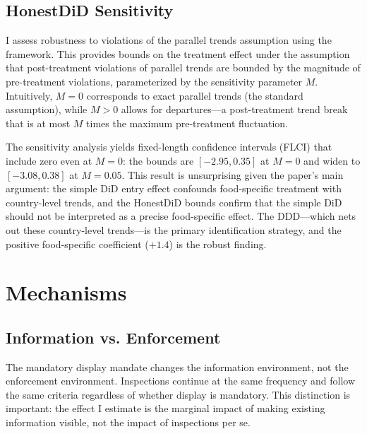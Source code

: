 \documentclass[12pt]{article}
\begin{document}
\subsection{HonestDiD Sensitivity}

I assess robustness to violations of the parallel trends assumption using the \citet{rambachan2023more} framework. This provides bounds on the treatment effect under the assumption that post-treatment violations of parallel trends are bounded by the magnitude of pre-treatment violations, parameterized by the sensitivity parameter $M$. Intuitively, $M=0$ corresponds to exact parallel trends (the standard assumption), while $M>0$ allows for departures---a post-treatment trend break that is at most $M$ times the maximum pre-treatment fluctuation.

The sensitivity analysis yields fixed-length confidence intervals (FLCI) that include zero even at $M = 0$: the bounds are $[-2.95, 0.35]$ at $M = 0$ and widen to $[-3.08, 0.38]$ at $M = 0.05$. This result is unsurprising given the paper's main argument: the simple DiD entry effect confounds food-specific treatment with country-level trends, and the HonestDiD bounds confirm that the simple DiD should not be interpreted as a precise food-specific effect. The DDD---which nets out these country-level trends---is the primary identification strategy, and the positive food-specific coefficient ($+1.4$) is the robust finding.


\section{Mechanisms}
\label{sec:mechanisms}

\subsection{Information vs. Enforcement}

The mandatory display mandate changes the information environment, not the enforcement environment. Inspections continue at the same frequency and follow the same criteria regardless of whether display is mandatory. This distinction is important: the effect I estimate is the marginal impact of making existing information visible, not the impact of inspections per se.
\end{document}
